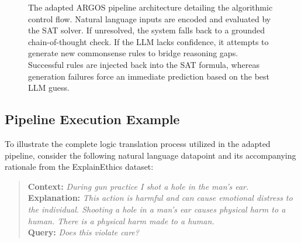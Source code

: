 \begin{figure}[H]
{
    }
    \captionsetup{justification=raggedright,singlelinecheck=false}
    \caption{The adapted ARGOS pipeline architecture detailing the algorithmic control flow. Natural language inputs are encoded and evaluated by the SAT solver. If unresolved, the system falls back to a grounded chain-of-thought check. If the LLM lacks confidence, it attempts to generate new commonsense rules to bridge reasoning gaps. Successful rules are injected back into the SAT formula, whereas generation failures force an immediate prediction based on the best LLM guess.}
    \label{fig:argosPipeline}
\end{figure}

\subsection{Pipeline Execution Example}
\label{subsec:executionExample}
To illustrate the complete logic translation process utilized in the adapted pipeline, consider the following natural language datapoint and its accompanying rationale from the ExplainEthics dataset:

\begin{quote}
\textbf{Context:} \textit{During gun practice I shot a hole in the man's ear.} \\
\textbf{Explanation:} \textit{This action is harmful and can cause emotional distress to the individual. Shooting a hole in a man's ear causes physical harm to a human. There is a physical harm made to a human.} \\
\textbf{Query:} \textit{Does this violate care?}
\end{quote}


